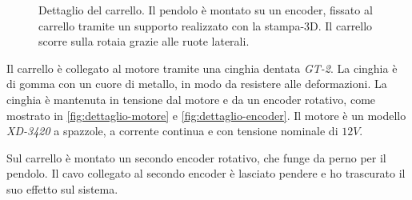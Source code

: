 \begin{figure}
    \centering
    \caption[Dettaglio del carrello]{Dettaglio del carrello. Il pendolo è montato
    su un encoder, fissato al carrello tramite un supporto realizzato con la
    stampa-3D. Il carrello scorre sulla rotaia grazie alle ruote laterali.}
    \label{fig:dettaglio-carrello}
\end{figure}

Il carrello è collegato al motore tramite una cinghia dentata \emph{GT-2}.
La cinghia è di gomma con un cuore di metallo, in modo da resistere
alle deformazioni.
La cinghia è mantenuta in tensione dal motore e da un
encoder rotativo, come mostrato in \autoref{fig:dettaglio-motore} e
\autoref{fig:dettaglio-encoder}.
Il motore è un modello \emph{XD-3420}
a spazzole, a corrente continua e con tensione nominale di $12V$.

Sul carrello è montato un secondo encoder rotativo,
che funge da perno per il pendolo.
Il cavo collegato al secondo encoder è lasciato pendere
e ho trascurato il suo effetto sul sistema.


